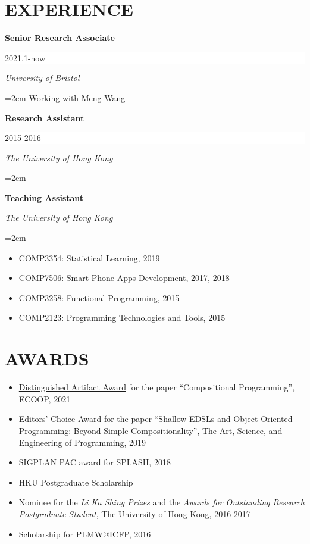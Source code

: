 \documentclass[paper=letter,fontsize=11pt]{scrartcl} %
\newcommand{\sepspace}{\vspace*{1em}}		%
\newcommand{\NewPart}[2]{\section*{\uppercase{#1} #2}}
\newcommand{\EducationEntry}[4]{
		\noindent \textbf{#1} \hfill      %
		\colorbox{White}{%
			\parbox{6em}{%
			\hfill\color{Black}#2}} \par  %
		\noindent \textit{#3} \par        %
		\noindent\hangindent=2em\hangafter=0 \small #4 %
		\normalsize \par}
\newcommand{\PaperEntry}[4]{
		\noindent #1, ``{#2}", In \textit{#3}, #4.} %
\newcommand{\ArxivEntry}[3]{
		\noindent #1, ``\href{http://arxiv.org/abs/#3}{#2}", \textit{{cond-mat/}#3}.}
\begin{document}



\NewPart{Experience}{}
\EducationEntry{Senior Research Associate}{2021.1-now}{University of Bristol}{Working with Meng Wang}
\EducationEntry{Research Assistant}{2015-2016}{The University of Hong Kong}{}
\EducationEntry{Teaching Assistant}{}{The University of Hong Kong}
{\begin{itemize}
\item{COMP3354: Statistical Learning, 2019}
\item{COMP7506: Smart Phone Apps Development, \href{https://msccs.cs.hku.hk/public/courses/2017/COMP7506A}{2017}, \href{https://msccs.cs.hku.hk/public/courses/2018/COMP7506A}{2018}}
\item{COMP3258: Functional Programming, 2015}
\item{COMP2123: Programming Technologies and Tools, 2015}
\end{itemize}}
\sepspace

\NewPart{Awards}{}
\begin{itemize}
\item \href{https://2021.ecoop.org/attending/ecoop-awards#distinguished-artifact-awards}{Distinguished Artifact Award} for the paper ``Compositional Programming'', ECOOP, 2021
\item \href{https://programming-journal.org/awards}{Editors' Choice Award} for the paper ``Shallow EDSLs and Object-Oriented
  Programming: Beyond Simple Compositionality'', The Art, Science, and Engineering of Programming, 2019
\item SIGPLAN PAC award for SPLASH, 2018
\item HKU Postgraduate Scholarship
\item Nominee for the \emph{Li Ka Shing Prizes} and the \emph{Awards for Outstanding Research
  Postgraduate Student}, The University of Hong Kong, 2016-2017
\item Scholarship for PLMW@ICFP, 2016
\end{itemize}
\end{document}
